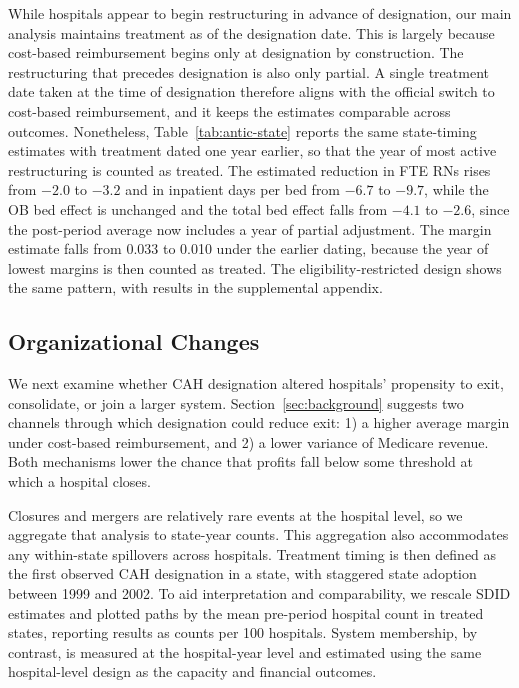 \documentclass[a4paper, 12pt, twoside]{article}
\begin{document}
While hospitals appear to begin restructuring in advance of designation, our main analysis maintains treatment as of the designation date. This is largely because cost-based reimbursement begins only at designation by construction. The restructuring that precedes designation is also only partial. A single treatment date taken at the time of designation therefore aligns with the official switch to cost-based reimbursement, and it keeps the estimates comparable across outcomes. Nonetheless, Table~\ref{tab:antic-state} reports the same state-timing estimates with treatment dated one year earlier, so that the year of most active restructuring is counted as treated. The estimated reduction in FTE RNs rises from $-2.0$ to $-3.2$ and in inpatient days per bed from $-6.7$ to $-9.7$, while the OB bed effect is unchanged and the total bed effect falls from $-4.1$ to $-2.6$, since the post-period average now includes a year of partial adjustment. The margin estimate falls from 0.033 to 0.010 under the earlier dating, because the year of lowest margins is then counted as treated. The eligibility-restricted design shows the same pattern, with results in the supplemental appendix.

\subsection{Organizational Changes}
\label{sec:orgchange}

We next examine whether CAH designation altered hospitals’ propensity to exit, consolidate, or join a larger system. Section~\ref{sec:background} suggests two channels through which designation could reduce exit: 1) a higher average margin under cost-based reimbursement, and 2) a lower variance of Medicare revenue. Both mechanisms lower the chance that profits fall below some threshold at which a hospital closes.

Closures and mergers are relatively rare events at the hospital level, so we aggregate that analysis to state-year counts. This aggregation also accommodates any within-state spillovers across hospitals. Treatment timing is then defined as the first observed CAH designation in a state, with staggered state adoption between 1999 and 2002. To aid interpretation and comparability, we rescale SDID estimates and plotted paths by the mean pre-period hospital count in treated states, reporting results as counts per 100 hospitals. System membership, by contrast, is measured at the hospital-year level and estimated using the same hospital-level design as the capacity and financial outcomes.
\end{document}
